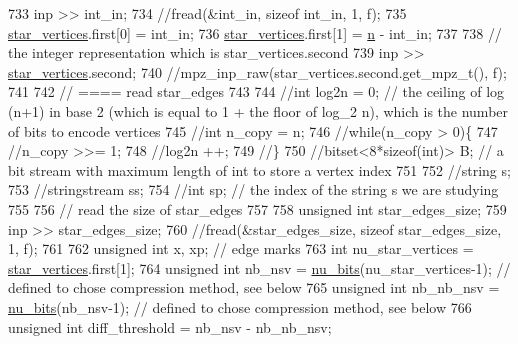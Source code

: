 \begin{DoxyCode}
733   inp >> int\_in;
734   \textcolor{comment}{//fread(&int\_in, sizeof int\_in, 1, f);}
735   \hyperlink{classmarked__graph__compressed_a7a4ced4586e2e353f9076bd447df5208}{star\_vertices}.first[0] = int\_in;
736   \hyperlink{classmarked__graph__compressed_a7a4ced4586e2e353f9076bd447df5208}{star\_vertices}.first[1] = \hyperlink{classmarked__graph__compressed_a8d841016ddb11cfd33748c8deb6277ba}{n} - int\_in;
737 
738   \textcolor{comment}{// the integer representation which is star\_vertices.second}
739   inp >> \hyperlink{classmarked__graph__compressed_a7a4ced4586e2e353f9076bd447df5208}{star\_vertices}.second;
740   \textcolor{comment}{//mpz\_inp\_raw(star\_vertices.second.get\_mpz\_t(), f);}
741 
742   \textcolor{comment}{// ==== read star\_edges}
743 
744   \textcolor{comment}{//int log2n = 0; // the ceiling of log (n+1) in base 2 (which is equal to 1 + the floor of log\_2 n),
       which is the number of bits to encode vertices}
745   \textcolor{comment}{//int n\_copy = n;}
746   \textcolor{comment}{//while(n\_copy > 0)\{}
747   \textcolor{comment}{//n\_copy >>= 1;}
748   \textcolor{comment}{//log2n ++;}
749   \textcolor{comment}{//\}}
750   \textcolor{comment}{//bitset<8*sizeof(int)> B; // a bit stream with maximum length of int to store a vertex index}
751 
752   \textcolor{comment}{//string s;}
753   \textcolor{comment}{//stringstream ss;}
754   \textcolor{comment}{//int sp; // the index of the string s we are studying }
755 
756   \textcolor{comment}{// read the size of star\_edges}
757 
758   \textcolor{keywordtype}{unsigned} \textcolor{keywordtype}{int} star\_edges\_size;
759   inp >> star\_edges\_size;
760   \textcolor{comment}{//fread(&star\_edges\_size, sizeof star\_edges\_size, 1, f);}
761 
762   \textcolor{keywordtype}{unsigned} \textcolor{keywordtype}{int} x, xp; \textcolor{comment}{// edge marks}
763   \textcolor{keywordtype}{int} nu\_star\_vertices = \hyperlink{classmarked__graph__compressed_a7a4ced4586e2e353f9076bd447df5208}{star\_vertices}.first[1];
764   \textcolor{keywordtype}{unsigned} \textcolor{keywordtype}{int} nb\_nsv = \hyperlink{bitstream_8cpp_a9dfce6f51e3febb3973aa3b16c2fecb4}{nu\_bits}(nu\_star\_vertices-1); \textcolor{comment}{// defined to chose compression method, see
       below}
765   \textcolor{keywordtype}{unsigned} \textcolor{keywordtype}{int} nb\_nb\_nsv = \hyperlink{bitstream_8cpp_a9dfce6f51e3febb3973aa3b16c2fecb4}{nu\_bits}(nb\_nsv-1); \textcolor{comment}{// defined to chose compression method, see below}
766   \textcolor{keywordtype}{unsigned} \textcolor{keywordtype}{int} diff\_threshold = nb\_nsv - nb\_nb\_nsv;

\end{DoxyCode}
